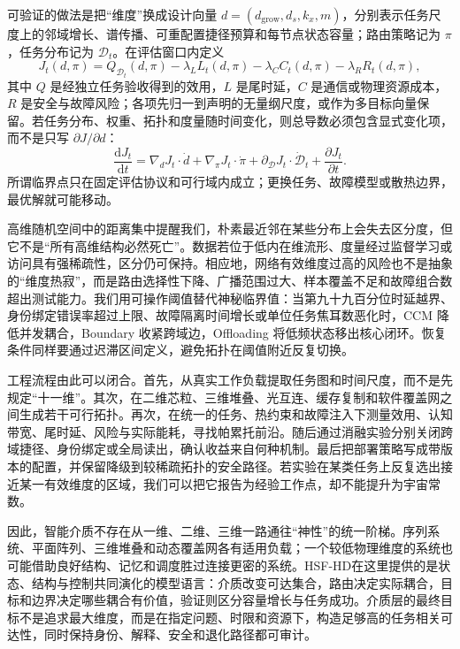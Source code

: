 可验证的做法是把“维度”换成设计向量 $d=(d_{\mathrm{grow}},d_s,k_x,m)$，分别表示任务尺度上的邻域增长、谱传播、可重配置捷径预算和每节点状态容量；路由策略记为 $\pi$，任务分布记为 $\mathcal D_t$。在评估窗口内定义
\[
J_t(d,\pi)=Q_{\mathcal D_t}(d,\pi)
-\lambda_L L_t(d,\pi)-\lambda_C C_t(d,\pi)
-\lambda_R R_t(d,\pi),
\]
其中 $Q$ 是经独立任务验收得到的效用，$L$ 是尾时延，$C$ 是通信或物理资源成本，$R$ 是安全与故障风险；各项先归一到声明的无量纲尺度，或作为多目标向量保留。若任务分布、权重、拓扑和度量随时间变化，则总导数必须包含显式变化项，而不是只写 $\partial J/\partial d$：
\[
\frac{\mathrm dJ_t}{\mathrm dt}
=\nabla_dJ_t\!\cdot\dot d
+\nabla_\pi J_t\!\cdot\dot\pi
+\partial_{\mathcal D}J_t\!\cdot\dot{\mathcal D}_t
+\frac{\partial J_t}{\partial t}.
\]
所谓临界点只在固定评估协议和可行域内成立；更换任务、故障模型或散热边界，最优解就可能移动。

高维随机空间中的距离集中提醒我们，朴素最近邻在某些分布上会失去区分度，但它不是“所有高维结构必然死亡”。数据若位于低内在维流形、度量经过监督学习或访问具有强稀疏性，区分仍可保持。相应地，网络有效维度过高的风险也不是抽象的“维度热寂”，而是路由选择性下降、广播范围过大、样本覆盖不足和故障组合数超出测试能力。我们用可操作阈值替代神秘临界值：当第九十九百分位时延越界、身份绑定错误率超过上限、故障隔离时间增长或单位任务焦耳数恶化时，CCM 降低并发耦合，Boundary 收紧跨域边，Offloading 将低频状态移出核心闭环。恢复条件同样要通过迟滞区间定义，避免拓扑在阈值附近反复切换。

工程流程由此可以闭合。首先，从真实工作负载提取任务图和时间尺度，而不是先规定“十一维”。其次，在二维芯粒、三维堆叠、光互连、缓存复制和软件覆盖网之间生成若干可行拓扑。再次，在统一的任务、热约束和故障注入下测量效用、认知带宽、尾时延、风险与实际能耗，寻找帕累托前沿。随后通过消融实验分别关闭跨域捷径、身份绑定或全局读出，确认收益来自何种机制。最后把部署策略写成带版本的配置，并保留降级到较稀疏拓扑的安全路径。若实验在某类任务上反复选出接近某一有效维度的区域，我们可以把它报告为经验工作点，却不能提升为宇宙常数。

因此，智能介质不存在从一维、二维、三维一路通往“神性”的统一阶梯。序列系统、平面阵列、三维堆叠和动态覆盖网各有适用负载；一个较低物理维度的系统也可能借助良好结构、记忆和调度胜过连接更密的系统。HSF-HD在这里提供的是状态、结构与控制共同演化的模型语言：介质改变可达集合，路由决定实际耦合，目标和边界决定哪些耦合有价值，验证则区分容量增长与任务成功。介质层的最终目标不是追求最大维度，而是在指定问题、时限和资源下，构造足够高的任务相关可达性，同时保持身份、解释、安全和退化路径都可审计。

